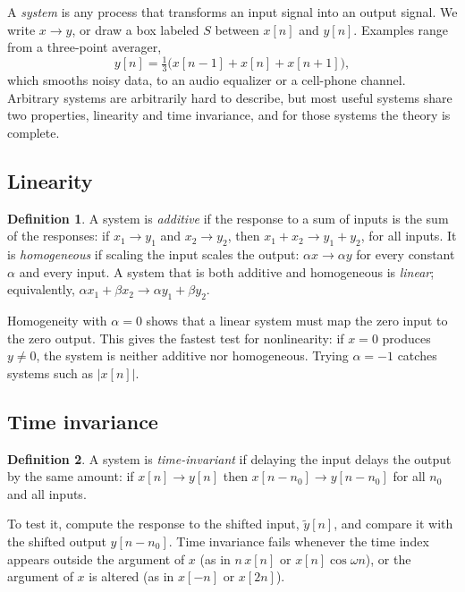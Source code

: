 \documentclass[11pt]{article}
\numberwithin{equation}{section}
\theoremstyle{definition}
\newtheorem{definition}{Definition}[section]
\theoremstyle{remark}
\begin{document}
A \emph{system} is any process that transforms an input signal into an output signal. We write
$x\to y$, or draw a box labeled $S$ between $x[n]$ and $y[n]$. Examples range from a three-point
averager,
\begin{equation}
y[n]=\tfrac13\big(x[n-1]+x[n]+x[n+1]\big),
\end{equation}
which smooths noisy data, to an audio equalizer or a cell-phone channel. Arbitrary systems are
arbitrarily hard to describe, but most useful systems share two properties, linearity and time
invariance, and for those systems the theory is complete.

\subsection{Linearity}
\begin{definition}
A system is \emph{additive} if the response to a sum of inputs is the sum of the responses:
if $x_1\to y_1$ and $x_2\to y_2$, then $x_1+x_2\to y_1+y_2$, for all inputs.
It is \emph{homogeneous} if scaling the input scales the output: $\alpha x\to\alpha y$ for every
constant $\alpha$ and every input. A system that is both additive and homogeneous is
\emph{linear}; equivalently, $\alpha x_1+\beta x_2\to\alpha y_1+\beta y_2$.
\end{definition}

Homogeneity with $\alpha=0$ shows that a linear system must map the zero input to the zero
output. This gives the fastest test for nonlinearity: if $x=0$ produces $y\neq0$, the system is
neither additive nor homogeneous. Trying $\alpha=-1$ catches systems such as $|x[n]|$.

\subsection{Time invariance}
\begin{definition}
A system is \emph{time-invariant} if delaying the input delays the output by the same amount:
if $x[n]\to y[n]$ then $x[n-n_0]\to y[n-n_0]$ for all $n_0$ and all inputs.
\end{definition}

To test it, compute the response to the shifted input, $\tilde y[n]$, and compare it with the
shifted output $y[n-n_0]$. Time invariance fails whenever the time index appears outside the
argument of $x$ (as in $n\,x[n]$ or $x[n]\cos\omega n$), or the argument of $x$ is altered
(as in $x[-n]$ or $x[2n]$).
\end{document}
